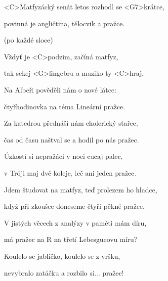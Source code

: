 

\zs
<C>Matfyzácký senát letos rozhodl se <G7>krátce,

povinná je angličtina, tělocvik a pražce.
\ks

\zr (po každé sloce)

Vždyť je <C>podzim, začíná matfyz,

tak sekej <G>lingebru a muziko ty <C>hraj.
\kr

\zs
Na Albeři pověděli nám o nové látce:

čtyřhodinovka na téma Lineární pražce.
\ks

\zs
Za katedrou přednáší nám cholerický stařec,

čas od času naštval se a hodil po nás pražec.
\ks

\zs
Úzkostí si nepražáci v noci cucaj palec,

v Tróji maj dvě koleje, leč ani jeden pražec.
\ks

\zs
Jdem študovat na matfyz, teď prolezem ho hladce,

když při zkoušce doneseme čtyři pěkné pražce.
\ks

\zs
V jistých věcech z analýzy v paměti mám díru,

má pražec na R na třetí Lebesgueovu míru?
\ks

\zs
Koulelo se jablíčko, koulelo se z vršku,

nevybralo zatáčku a rozbilo si... pražec!
\ks

\kp
